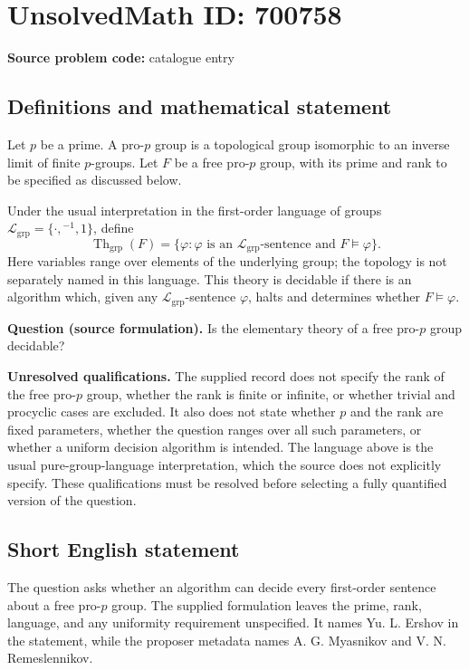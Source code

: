 \documentclass[11pt]{article}
\begin{document}
\section*{UnsolvedMath ID: 700758}
\textbf{Source problem code:} catalogue entry
\subsection{Definitions and mathematical statement}
Let \(p\) be a prime. A pro-\(p\) group is a topological group isomorphic to an inverse limit of finite \(p\)-groups. Let \(F\) be a free pro-\(p\) group, with its prime and rank to be specified as discussed below.

Under the usual interpretation in the first-order language of groups \(\mathcal L_{\mathrm{grp}}=\{\cdot,{}^{-1},1\}\), define
\[
\operatorname{Th}_{\mathrm{grp}}(F)=\{\varphi:\varphi\text{ is an }\mathcal L_{\mathrm{grp}}\text{-sentence and }F\models\varphi\}.
\]
Here variables range over elements of the underlying group; the topology is not separately named in this language. This theory is decidable if there is an algorithm which, given any \(\mathcal L_{\mathrm{grp}}\)-sentence \(\varphi\), halts and determines whether \(F\models\varphi\).

\textbf{Question (source formulation).} Is the elementary theory of a free pro-\(p\) group decidable?

\textbf{Unresolved qualifications.} The supplied record does not specify the rank of the free pro-\(p\) group, whether the rank is finite or infinite, or whether trivial and procyclic cases are excluded. It also does not state whether \(p\) and the rank are fixed parameters, whether the question ranges over all such parameters, or whether a uniform decision algorithm is intended. The language above is the usual pure-group-language interpretation, which the source does not explicitly specify. These qualifications must be resolved before selecting a fully quantified version of the question.
\subsection{Short English statement}
The question asks whether an algorithm can decide every first-order sentence about a free pro-\(p\) group. The supplied formulation leaves the prime, rank, language, and any uniformity requirement unspecified. It names Yu. L. Ershov in the statement, while the proposer metadata names A. G. Myasnikov and V. N. Remeslennikov.
\end{document}
